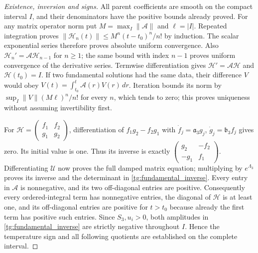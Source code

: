 \begin{proof}[Existence, inversion and signs]
All parent coefficients are smooth on the compact interval $I$, and
their denominators have the positive bounds already proved. For any
matrix operator norm put $M=\max_I\|\mathcal A\|$ and
$\ell=|I|$. Repeated integration proves
$\|\mathcal H_n(t)\|\leq M^n(t-t_0)^n/n!$ by induction.
The scalar exponential series therefore proves absolute uniform
convergence. Also
$\mathcal H_n'=\mathcal A\mathcal H_{n-1}$ for $n\geq1$;
the same bound with index $n-1$ proves uniform convergence of the
derivative series. Termwise differentiation gives
$\mathcal H'=\mathcal A\mathcal H$ and $\mathcal H(t_0)=I$.
If two fundamental solutions had the same data, their difference
$V$ would obey $V(t)=\int_{t_0}^t\mathcal A(r)V(r)\,dr$.
Iteration bounds its norm by
$\sup_I\|V\|(M\ell)^n/n!$ for every $n$, which tends to zero;
this proves uniqueness without assuming invertibility first.

For $\mathcal H=\left(\begin{smallmatrix}f_1&f_2\\g_1&g_2\end{smallmatrix}\right)$,
differentiation of $f_1g_2-f_2g_1$ with
$\dot f_j=\mathfrak a_3g_j$,
$\dot g_j=\mathfrak b_3f_j$ gives zero. Its initial value is one.
Thus its inverse is exactly
$\left(\begin{smallmatrix}g_2&-f_2\\-g_1&f_1\end{smallmatrix}\right)$.
Differentiating $\mathcal U$ now proves the full damped matrix
equation; multiplying by $e^{\Lambda_3}$ proves its inverse and
the determinant in \eqref{tg:fundamental_inverse}.
Every entry in $\mathcal A$ is nonnegative, and its two off-diagonal
entries are positive. Consequently every ordered-integral term has
nonnegative entries, the diagonal of $\mathcal H$ is at least one,
and its off-diagonal entries are positive for $t>t_0$ because already
the first term has positive such entries. Since $S_3,u_i>0$, both
amplitudes in \eqref{tg:fundamental_inverse} are strictly negative
throughout $I$. Hence the temperature sign and all following
quotients are established on the complete interval.
\end{proof}

